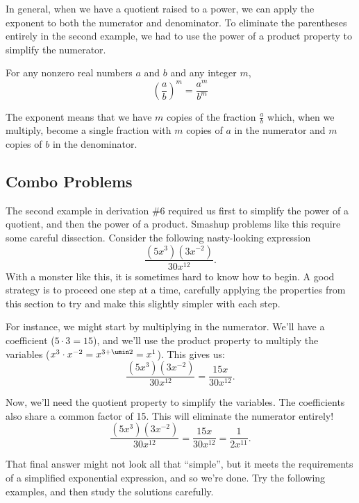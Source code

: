 In general, when we have a quotient raised to a power, we can apply the exponent to both the numerator and denominator. To eliminate the parentheses entirely in the second example, we had to use the power of a product property to simplify the numerator.

\begin{boxeddef}
For any nonzero real numbers $a$ and $b$ and any integer $m$, \[\left(\frac{a}{b}\right)^m = \frac{a^m}{b^m}\]
\end{boxeddef}

The exponent means that we have $m$ copies of the fraction $\frac{a}{b}$ which, when we multiply, become a single fraction with $m$ copies of $a$ in the numerator and $m$ copies of $b$ in the denominator.

\subsection{Combo Problems}

The second example in derivation \#6 required us first to simplify the power of a quotient, and then the power of a product. Smashup problems like this require some careful dissection. Consider the following nasty-looking expression
\[\frac{(5x^3)(3x^{-2})}{30x^{12}}.\]
With a monster like this, it is sometimes hard to know how to begin. A good strategy is to proceed one step at a time, carefully applying the properties from this section to try and make this slightly simpler with each step.

For instance, we might start by multiplying in the numerator. We'll have a coefficient ($5\cdot3 = 15$), and we'll use the product property to multiply the variables ($x^3 \cdot x^{-2} = x^{3+\umin2} = x^1$). This gives us:
\[\frac{(5x^3)(3x^{-2})}{30x^{12}} = \frac{15x}{30x^{12}}.\]

Now, we'll need the quotient property to simplify the variables. The coefficients also share a common factor of 15. This will eliminate the numerator entirely!
\[\frac{(5x^3)(3x^{-2})}{30x^{12}} = \frac{15x}{30x^{12}} = \frac{1}{2x^{11}}.\]

That final answer might not look all that ``simple'', but it meets the requirements of a simplified exponential expression, and so we're done. Try the following examples, and then study the solutions carefully.

